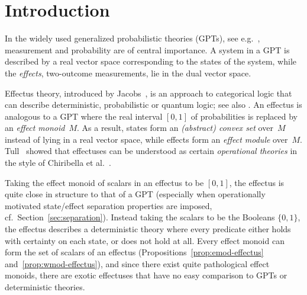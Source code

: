 \documentclass[%
	submission,
copyright,creativecommons,UKenglish]{eptcs}
\begin{document}
\section{Introduction}

In the widely used generalized probabilistic theories
(GPTs),
see e.g.~\cite{barrett2007information,BarnumBCLS2010,BarnumW2016,CassinelliL2016},
measurement and probability are of central importance. A system in a
GPT is described by a
real vector space
corresponding to the states of the system, while the \emph{effects},
two-outcome measurements, lie in the dual vector space.

Effectus theory, introduced by Jacobs~\cite{jacobs2015new},
is an approach to categorical logic that can describe
deterministic, probabilistic or quantum logic;
see also \cite{cho2015introduction,Cho2019PhD,basthesis}.
An effectus is analogous to a GPT where the real interval $[0,1]$
of probabilities is replaced by an \emph{effect
monoid}~$M$. As a result, states form an \emph{(abstract) convex set} over~$M$ instead of lying in a real vector space, while effects form an \emph{effect module} over~$M$.
Tull~\cite{tull2016,tull2019phdthesis}
showed that effectuses can be understood as
certain \emph{operational theories}
in the style of
Chiribella et al.~\cite{chiribella2010probabilistic,DArianoCP2017}.

Taking the effect monoid of scalars in an effectus to be $[0,1]$, the effectus is quite close in structure to that of a GPT (especially when operationally motivated state/effect separation properties are imposed, cf.~Section~\ref{sec:separation}). 
Instead taking the scalars to be the Booleans $\{0,1\}$, the effectus describes a deterministic theory where every predicate either holds with certainty on each state, or does not hold at all.
Every effect monoid can form the set of scalars of an effectus
(Propositions~\ref{prop:emod-effectus}
and~\ref{prop:wmod-effectus}),
and since there exist quite pathological effect
monoids, there are exotic effectuses that have no easy comparison
to GPTs or deterministic theories.
\end{document}
